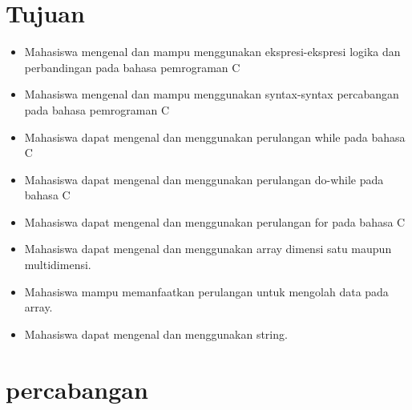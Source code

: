 \section*{Tujuan}
\begin{itemize}[label=$\bullet$, itemsep=-1pt, leftmargin=*]
	\item Mahasiswa mengenal dan mampu menggunakan ekspresi-ekspresi logika dan perbandingan pada bahasa pemrograman C
	\item Mahasiswa mengenal dan mampu menggunakan syntax-syntax percabangan pada bahasa pemrograman C
	\item Mahasiswa dapat mengenal dan menggunakan perulangan while pada bahasa C
	\item Mahasiswa dapat mengenal dan menggunakan perulangan do-while pada bahasa C
	\item Mahasiswa dapat mengenal dan menggunakan perulangan for pada bahasa C
	\item Mahasiswa dapat mengenal dan menggunakan  array dimensi satu maupun multidimensi.
	\item Mahasiswa mampu memanfaatkan perulangan untuk mengolah data pada array.
	\item Mahasiswa  dapat mengenal dan menggunakan  string.
\end{itemize}

\section{percabangan}

